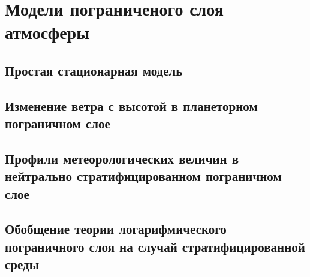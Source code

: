 \chapter{Модели пограниченого слоя атмосферы}
    \lipsum[1-2]

\section{Простая стационарная модель}
    \lipsum[1-2]

\section{Изменение ветра с высотой в планеторном пограничном слое}
    \lipsum[1-2]

\section{Профили метеорологических величин в 
нейтрально стратифицированном пограничном слое}
    \lipsum[1-2]

\section{Обобщение теории логарифмического пограничного слоя на случай стратифицированной среды}
    \lipsum[1-2]

